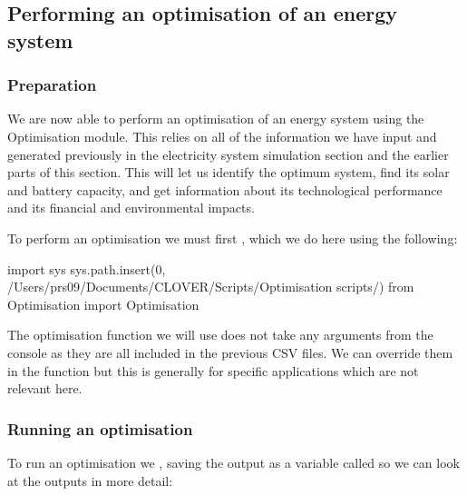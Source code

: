 \documentclass[letterpaper,10pt,english]{sphinxmanual}
\begin{document}
\sphinxAtStartPar
{}  


\subsection{Performing an optimisation of an energy system}
\label{\detokenize{optimisation:performing-an-optimisation-of-an-energy-system}}

\subsubsection{Preparation}
\label{\detokenize{optimisation:id1}}
\sphinxAtStartPar
We are now able to perform an optimisation of an energy system using the
Optimisation module. This relies on all of the information we have input
and generated previously in the electricity system simulation section and
the earlier parts of this section. This will let us identify the optimum
system, find its solar and battery capacity, and get information about
its technological performance and its financial and environmental
impacts.

\sphinxAtStartPar
To perform an optimisation we must first , which we do here using
the following:

\begin{sphinxVerbatim}[commandchars=\\\{\}]
import sys
sys.path.insert(0, \PYGZsq{}/Users/prs09/Documents/CLOVER/Scripts/Optimisation scripts/\PYGZsq{})
from Optimisation import Optimisation
\end{sphinxVerbatim}

\sphinxAtStartPar
The optimisation function we will use does not take any arguments from
the console as they are all included in the previous CSV files. We can
override them in the function but this is generally for specific
applications which are not relevant here.


\subsubsection{Running an optimisation}
\label{\detokenize{optimisation:running-an-optimisation}}
\sphinxAtStartPar
To run an optimisation we ,
saving the output as a variable called  so we
can look at the outputs in more detail:
\end{document}
